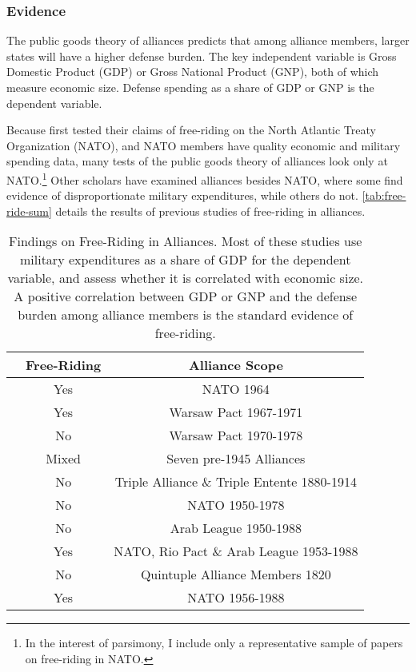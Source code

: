 \documentclass[12pt]{article}
\begin{document}
\subsubsection{Evidence}


The public goods theory of alliances predicts that among alliance members, larger states will have a higher defense burden. 
The key independent variable is Gross Domestic Product (GDP) or Gross National Product (GNP), both of which measure economic size. 
Defense spending as a share of GDP or GNP is the dependent variable. 


Because \citet{OlsonZeckhauser1966} first tested their claims of free-riding on the North Atlantic Treaty Organization (NATO), and NATO members have quality economic and military spending data, many tests of the public goods theory of alliances look only at NATO.\footnote{In the interest of parsimony, I include only a representative sample of papers on free-riding in NATO.}
Other scholars have examined alliances besides NATO, where some find evidence of disproportionate military expenditures, while others do not. 
\autoref{tab:free-ride-sum} details the results of previous studies of free-riding in alliances. 


\begin{table}[hbt]
\begin{tabular}{lcc}
  & Free-Riding & Alliance Scope \\
\hline
\citet{OlsonZeckhauser1966} & Yes  & NATO 1964 \\
\citet{Starr1974} & Yes & Warsaw Pact 1967-1971 \\
\citet{Reisinger1983} & No & Warsaw Pact 1970-1978 \\
\citet{Thies1987} & Mixed & Seven pre-1945 Alliances \\ 
\citet{ConybeareSandler1990} & No & Triple Alliance \& Triple Entente 1880-1914 \\
\citet{Palmer1990} & No & NATO 1950-1978 \\
\citet{Chenetal1996} & No & Arab League 1950-1988 \\
\citet{OnealWhatley1996} & Yes & NATO, Rio Pact \& Arab League 1953-1988 \\
\citet{Siroky2012} & No & Quintuple Alliance Members 1820 \\
\citet{PluemperNeumayer2015} & Yes & NATO 1956-1988 \\
\hline 
\end{tabular}
\caption{Findings on Free-Riding in Alliances. Most of these studies use military expenditures as a share of GDP for the dependent variable, and assess whether it is correlated with economic size. A positive correlation between GDP or GNP and the defense burden among alliance members is the standard evidence of free-riding.}
\label{tab:free-ride-sum}
\end{table}
\end{document}
